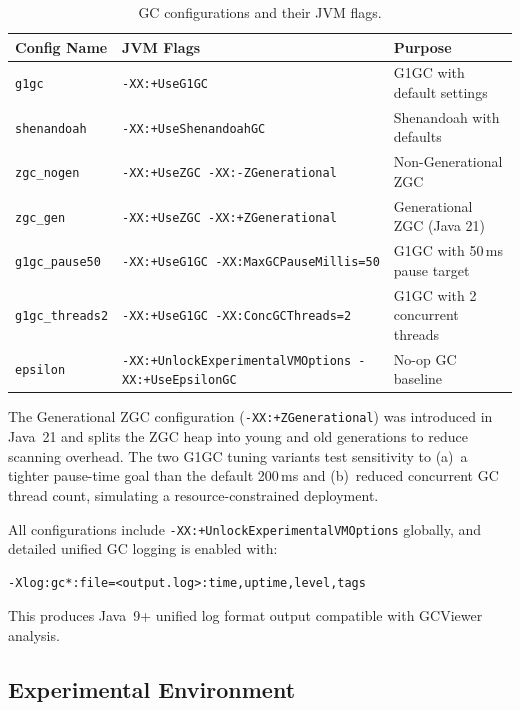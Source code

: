 \begin{table}[h]
\footnotesize
\centering
\caption{GC configurations and their JVM flags.}
\label{tab:gc-configs}
\begin{tabular}{lll}
\hline
\textbf{Config Name} & \textbf{JVM Flags} & \textbf{Purpose} \\
\hline
\texttt{g1gc}          & \texttt{-XX:+UseG1GC}                                    & G1GC with default settings \\
\texttt{shenandoah}    & \texttt{-XX:+UseShenandoahGC}                            & Shenandoah with defaults \\
\texttt{zgc\_nogen}    & \texttt{-XX:+UseZGC -XX:-ZGenerational}                  & Non-Generational ZGC \\
\texttt{zgc\_gen}      & \texttt{-XX:+UseZGC -XX:+ZGenerational}                  & Generational ZGC (Java 21) \\
\texttt{g1gc\_pause50} & \texttt{-XX:+UseG1GC -XX:MaxGCPauseMillis=50}            & G1GC with 50\,ms pause target \\
\texttt{g1gc\_threads2}& \texttt{-XX:+UseG1GC -XX:ConcGCThreads=2}               & G1GC with 2 concurrent threads \\
\texttt{epsilon}       & \texttt{-XX:+UnlockExperimentalVMOptions -XX:+UseEpsilonGC} & No-op GC baseline \\
\hline
\end{tabular}
\end{table}

The Generational ZGC configuration (\texttt{-XX:+ZGenerational}) was introduced in Java~21 and splits the ZGC heap into young and old generations to reduce scanning overhead. The two G1GC tuning variants test sensitivity to (a)~a tighter pause-time goal than the default 200\,ms and (b)~reduced concurrent GC thread count, simulating a resource-constrained deployment.

All configurations include \texttt{-XX:+UnlockExperimentalVMOptions} globally, and detailed unified GC logging is enabled with:

\begin{verbatim}
-Xlog:gc*:file=<output.log>:time,uptime,level,tags
\end{verbatim}

This produces Java~9+ unified log format output compatible with GCViewer analysis.

\subsection{Experimental Environment}

